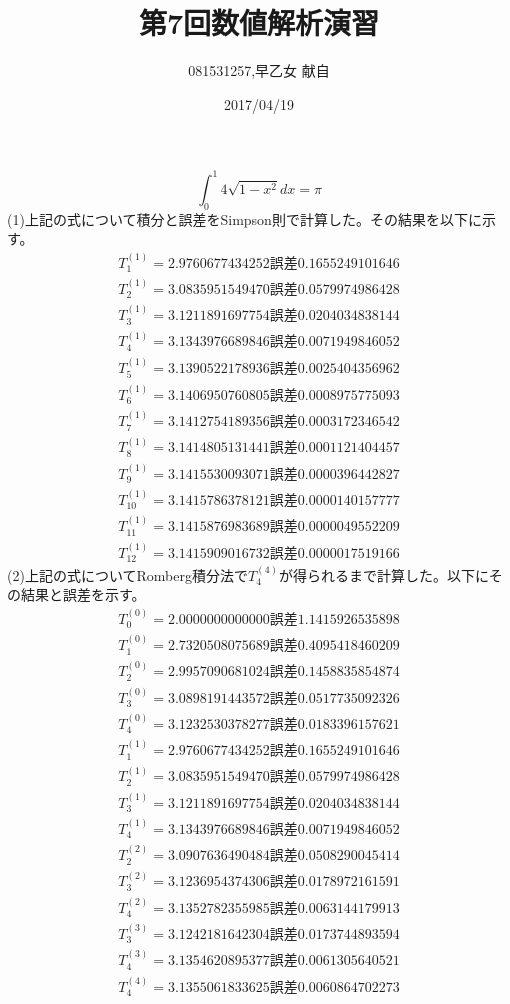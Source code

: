 \documentclass[]{jsarticle}
\title{第7回数値解析演習}
\author{081531257,早乙女 献自}
\date{2017/04/19}
\begin{document}
\maketitle
$$\int_0^1 4\sqrt{1-x^2}dx = \pi$$
\noindent
(1)上記の式について積分と誤差をSimpson則で計算した。その結果を以下に示す。\\
\begin{eqnarray}
T^{(1)}_1=2.9760677434252 誤差0.1655249101646\nonumber\\
T^{(1)}_2=3.0835951549470 誤差0.0579974986428\nonumber\\
T^{(1)}_3=3.1211891697754 誤差0.0204034838144\nonumber\\
T^{(1)}_4=3.1343976689846 誤差0.0071949846052\nonumber\\
T^{(1)}_5=3.1390522178936 誤差0.0025404356962\nonumber\\
T^{(1)}_6=3.1406950760805 誤差0.0008975775093\nonumber\\
T^{(1)}_7=3.1412754189356 誤差0.0003172346542\nonumber\\
T^{(1)}_8=3.1414805131441 誤差0.0001121404457\nonumber\\
T^{(1)}_9=3.1415530093071 誤差0.0000396442827\nonumber\\
T^{(1)}_10=3.1415786378121 誤差0.0000140157777\nonumber\\
T^{(1)}_11=3.1415876983689 誤差0.0000049552209\nonumber\\
T^{(1)}_12=3.1415909016732 誤差0.0000017519166\nonumber
\end{eqnarray}
(2)上記の式についてRomberg積分法で$T_4^{(4)}$が得られるまで計算した。以下にその結果と誤差を示す。\\
\begin{eqnarray}
T^{(0)}_0=2.0000000000000 誤差1.1415926535898\nonumber\\
T^{(0)}_1=2.7320508075689 誤差0.4095418460209\nonumber\\
T^{(0)}_2=2.9957090681024 誤差0.1458835854874\nonumber\\
T^{(0)}_3=3.0898191443572 誤差0.0517735092326\nonumber\\
T^{(0)}_4=3.1232530378277 誤差0.0183396157621\nonumber\\
T^{(1)}_1=2.9760677434252 誤差0.1655249101646\nonumber\\
T^{(1)}_2=3.0835951549470 誤差0.0579974986428\nonumber\\
T^{(1)}_3=3.1211891697754 誤差0.0204034838144\nonumber\\
T^{(1)}_4=3.1343976689846 誤差0.0071949846052\nonumber\\
T^{(2)}_2=3.0907636490484 誤差0.0508290045414\nonumber\\
T^{(2)}_3=3.1236954374306 誤差0.0178972161591\nonumber\\
T^{(2)}_4=3.1352782355985 誤差0.0063144179913\nonumber\\
T^{(3)}_3=3.1242181642304 誤差0.0173744893594\nonumber\\
T^{(3)}_4=3.1354620895377 誤差0.0061305640521\nonumber\\
T^{(4)}_4=3.1355061833625 誤差0.0060864702273\nonumber
\end{eqnarray}
\end{document}
